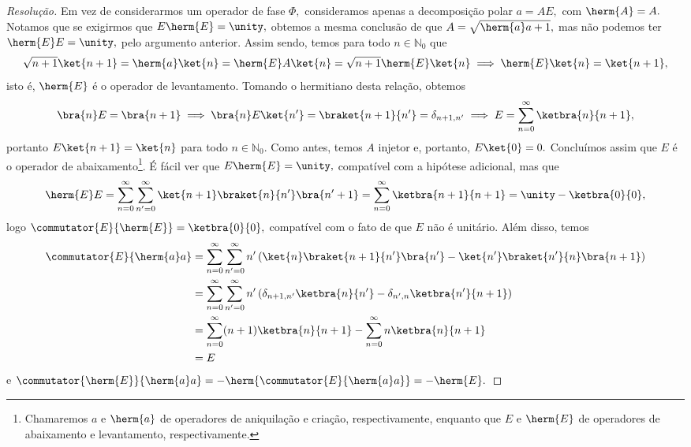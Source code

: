 \begin{proof}[Resolução]
   Em vez de considerarmos um operador de fase \(\Phi,\) consideramos apenas a decomposição polar \(a = A E,\) com \(\herm{A} = A.\) Notamos que se exigirmos que \(E \herm{E} = \unity,\) obtemos a mesma conclusão de que \(A = \sqrt{\herm{a}a + 1},\) mas não podemos ter \(\herm{E} E = \unity,\) pelo argumento anterior. Assim sendo, temos para todo \(n \in \mathbb{N}_0\) que
   \begin{equation*}
      \sqrt{n+1} \ket{n+1} = \herm{a} \ket{n} = \herm{E} A \ket{n} = \sqrt{n+1} \herm{E} \ket{n} \implies \herm{E}\ket{n} = \ket{n+1},
   \end{equation*}
   isto é, \(\herm{E}\) é o operador de levantamento. Tomando o hermitiano desta relação, obtemos
   \begin{equation*}
      \bra{n} E = \bra{n+1} \implies \bra{n} E \ket{n'} = \braket{n+1}{n'} = \delta_{n+1, n'} \implies E = \sum_{n = 0}^\infty \ketbra{n}{n+1},
   \end{equation*}
   portanto \(E\ket{n+1} = \ket{n}\) para todo \(n \in \mathbb{N}_0\). Como antes, temos \(A\) injetor e, portanto, \(E\ket{0} = 0.\) Concluímos assim que \(E\) é o operador de abaixamento\footnote{Chamaremos \(a\) e \(\herm{a}\) de operadores de aniquilação e criação, respectivamente, enquanto que \(E\) e \(\herm{E}\) de operadores de abaixamento e levantamento, respectivamente.}. É fácil ver que \(E \herm{E} = \unity,\) compatível com a hipótese adicional, mas que
   \begin{equation*}
      \herm{E}E = \sum_{n = 0}^\infty \sum_{n' = 0}^\infty \ket{n+1} \braket{n}{n'} \bra{n'+1} = \sum_{n = 0}^\infty \ketbra{n+1}{n+1} = \unity - \ketbra{0}{0},
   \end{equation*}
   logo \(\commutator{E}{\herm{E}} = \ketbra{0}{0},\) compatível com o fato de que \(E\) não é unitário. Além disso, temos
   \begin{align*}
      \commutator{E}{\herm{a}a} &= \sum_{n = 0}^\infty \sum_{n' = 0}^\infty n'\left(\ket{n}\braket{n+1}{n'}\bra{n'} - \ket{n'}\braket{n'}{n}\bra{n+1}\right)\\
                                &= \sum_{n=0}^\infty \sum_{n' = 0}^\infty n' \left(\delta_{n+1, n'} \ketbra{n}{n'} - \delta_{n',n} \ketbra{n'}{n+1}\right)\\
                                &= \sum_{n=0}^\infty (n+1) \ketbra{n}{n+1} - \sum_{n=0}^\infty n \ketbra{n}{n+1}\\
                                &= E
   \end{align*}
   e \(\commutator{\herm{E}}{\herm{a}a} = - \herm{\commutator{E}{\herm{a}a}} = - \herm{E}.\)


\end{proof}
